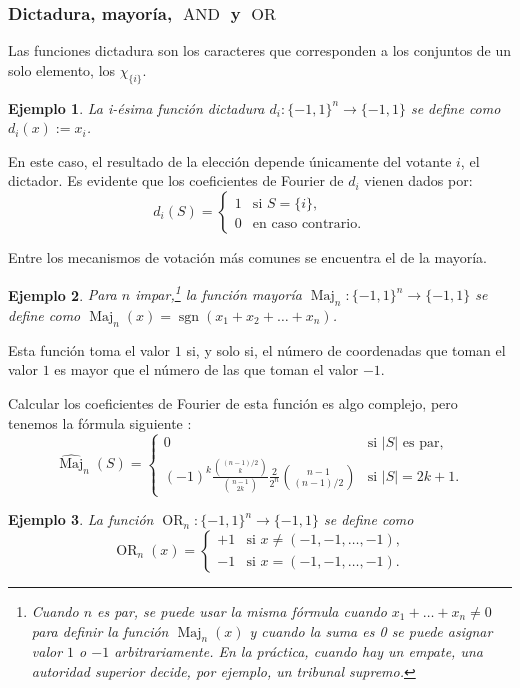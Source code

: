 \documentclass[autocontact]{gaceta}
\newtheorem{example}{Ejemplo}
\DeclareMathOperator{\sgn}{sgn}
\DeclareMathOperator{\AND}{AND}
\DeclareMathOperator{\OR}{OR}
\DeclareMathOperator{\Maj}{Maj}
\begin{document}
\subsubsection{Dictadura, mayoría, \texorpdfstring{$\AND$}{AND} y \texorpdfstring{$\OR$}{OR}}

Las funciones dictadura son los caracteres que corresponden a los conjuntos de un solo elemento, los $\chi_{\{i\}}$.

\begin{example}
La i-ésima función dictadura $d_i:\{-1,1\}^n\to\{-1,1\}$ se define como $d_i(x):=x_i$.
\end{example}

En este caso, el resultado de la elección depende únicamente del votante $i$, el dictador. Es evidente que los coeficientes de Fourier de $d_i$ vienen dados por:
\[
   \widehat{d_i}(S) = \begin{cases}
   1 &\text{si } S = \{i\},
   \\
   0 &\text{en caso contrario}.
   \end{cases}
\]

Entre los mecanismos de votación más comunes se encuentra el de la mayoría.

\begin{example}
Para $n$ impar,\footnote{Cuando $n$ es par, se puede usar la misma fórmula cuando $x_1+\dots +x_n\neq 0$ para definir la función $\Maj_n(x)$ y cuando la suma es 0 se puede asignar valor $1$ o $-1$ arbitrariamente. En la práctica, cuando hay un empate, una autoridad superior decide, por ejemplo, un tribunal supremo.} la función mayoría $\Maj_n: \{-1,1\}^n\to \{-1,1\}$ se define como $\Maj_n(x)=\sgn (x_1+x_2+\dots +x_n)$.
\end{example}

Esta función toma el valor $1$ si, y solo si, el número de coordenadas que toman el valor $1$ es mayor que el número de las que toman el valor $-1$.

Calcular los coeficientes de Fourier de esta función es algo complejo, pero tenemos la fórmula siguiente \cite[teorema 5.19]{O'Do21}:
\[
   \widehat{\Maj}_n(S)
   = \begin{cases}
   0 &\text{si } |S| \text{ es par},
   \\
   (-1)^k \frac{\binom{(n-1)/2}{k}}{\binom{n-1}{2k}}
   \frac{2}{2^n} \binom{n-1}{(n-1)/2}
   &\text{si } |S|=2k+1.
   \end{cases}
\]

\begin{example}
La función $\OR_n:\{-1,1\}^n\to\{-1,1\}$ se define como
\[
   \OR_n (x) = \begin{cases}
   +1 &\text{si } x \neq (-1,-1,\dots, -1),
   \\
   -1 &\text{si } x = (-1,-1,\dots, -1).
   \end{cases}
\]
\end{example}
\end{document}

